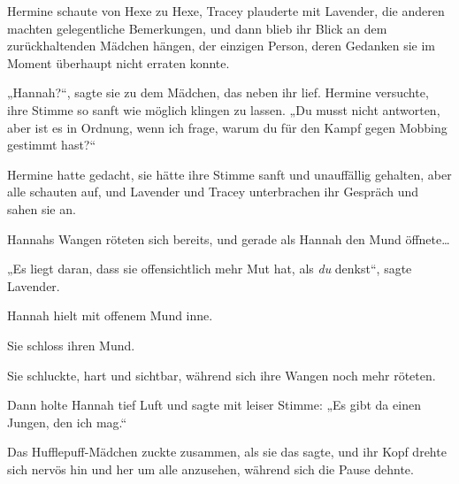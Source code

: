 Hermine schaute von Hexe zu Hexe, Tracey plauderte mit Lavender, die anderen machten gelegentliche Bemerkungen, und dann blieb ihr Blick an dem zurückhaltenden Mädchen hängen, der einzigen Person, deren Gedanken sie im Moment überhaupt nicht erraten konnte.

„Hannah?“, sagte sie zu dem Mädchen, das neben ihr lief. Hermine versuchte, ihre Stimme so sanft wie möglich klingen zu lassen. „Du musst nicht antworten, aber ist es in Ordnung, wenn ich frage, warum du für den Kampf gegen Mobbing gestimmt hast?“

Hermine hatte gedacht, sie hätte ihre Stimme sanft und unauffällig gehalten, aber alle schauten auf, und Lavender und Tracey unterbrachen ihr Gespräch und sahen sie an.

Hannahs Wangen röteten sich bereits, und gerade als Hannah den Mund öffnete…

„Es liegt daran, dass sie offensichtlich mehr Mut hat, als \emph{du} denkst“, sagte Lavender.

Hannah hielt mit offenem Mund inne.

Sie schloss ihren Mund.

Sie schluckte, hart und sichtbar, während sich ihre Wangen noch mehr röteten.

Dann holte Hannah tief Luft und sagte mit leiser Stimme: „Es gibt da einen Jungen, den ich mag.“

Das Hufflepuff-Mädchen zuckte zusammen, als sie das sagte, und ihr Kopf drehte sich nervös hin und her um alle anzusehen, während sich die Pause dehnte.


